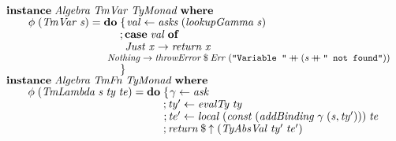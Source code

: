 \documentclass[10pt]{article}
\newcommand{\Conid}[1]{\mathit{#1}}
\newcommand{\Varid}[1]{\mathit{#1}}
\newcommand{\plus}{\mathbin{+\!\!\!+}}
\begin{document}
\begin{tabbing}
${}$\\
${\hskip1.00em\relax\mathbf{instance}\;\Conid{Algebra}\;\Conid{TmVar}\;\Conid{TyMonad}\;\mathbf{where}}$\\
${\hskip1.00em\relax\hskip2.00em\relax\Varid{\phi}\;(\Conid{TmVar}\;\Varid{s})\mathrel{=}\mathbf{do}\;\{\mskip1.5mu \Varid{val}\leftarrow \Varid{asks}\;(\Varid{lookupGamma}\;\Varid{s})}$\\
${\hskip1.00em\relax\hskip2.00em\relax\phantom{\Varid{\phi}\;(\Conid{TmVar}\;\Varid{s})\mathrel{=}\mathbf{do}\;\mbox{}};\mathbf{case}\;\Varid{val}\;\mathbf{of}}$\\
${\hskip1.00em\relax\hskip2.00em\relax\phantom{\Varid{\phi}\;(\Conid{TmVar}\;\Varid{s})\mathrel{=}\mathbf{do}\;\mbox{}}\phantom{;\mbox{}}\Conid{Just}\;\Varid{x}\to \Varid{return}\;\Varid{x}}$\\
${\hskip1.00em\relax\hskip2.00em\relax\phantom{\Varid{\phi}\;(\Conid{TmVar}\;\Varid{s})\mathrel{=}\mathbf{do}\;\mbox{}}\phantom{;\mbox{}}\Conid{Nothing}\to \Varid{throwError}\mathbin{\$}\Conid{Err}\;(\text{\tt \char34 Variable~\char34}\plus (\Varid{s}\plus \text{\tt \char34 ~not~found\char34}))}$\\
${\hskip1.00em\relax\hskip2.00em\relax\phantom{\Varid{\phi}\;(\Conid{TmVar}\;\Varid{s})\mathrel{=}\mathbf{do}\;\mbox{}}\mskip1.5mu\}}$\\
${}$\\
${\hskip1.00em\relax\mathbf{instance}\;\Conid{Algebra}\;\Conid{TmFn}\;\Conid{TyMonad}\;\mathbf{where}}$\\
${\hskip1.00em\relax\hskip2.00em\relax\Varid{\phi}\;(\Conid{TmLambda}\;\Varid{s}\;\Varid{ty}\;\Varid{te})\mathrel{=}\mathbf{do}\;\{\mskip1.5mu \Varid{\gamma}\leftarrow \Varid{ask}}$\\
${\hskip1.00em\relax\hskip2.00em\relax\phantom{\Varid{\phi}\;(\Conid{TmLambda}\;\Varid{s}\;\Varid{ty}\;\Varid{te})\mathrel{=}\mathbf{do}\;\mbox{}};\Varid{ty'}\leftarrow \Varid{evalTy}\;\Varid{ty}}$\\
${\hskip1.00em\relax\hskip2.00em\relax\phantom{\Varid{\phi}\;(\Conid{TmLambda}\;\Varid{s}\;\Varid{ty}\;\Varid{te})\mathrel{=}\mathbf{do}\;\mbox{}};\Varid{te'}\leftarrow \Varid{local}\;(\Varid{const}\;(\Varid{addBinding}\;\Varid{\gamma}\;(\Varid{s},\Varid{ty'})))\;\Varid{te}}$\\
${\hskip1.00em\relax\hskip2.00em\relax\phantom{\Varid{\phi}\;(\Conid{TmLambda}\;\Varid{s}\;\Varid{ty}\;\Varid{te})\mathrel{=}\mathbf{do}\;\mbox{}};\Varid{return}\mathbin{\$}\Varid{\uparrow}\;(\Conid{TyAbsVal}\;\Varid{ty'}\;\Varid{te'})}$\\

\end{tabbing}
\end{document}
